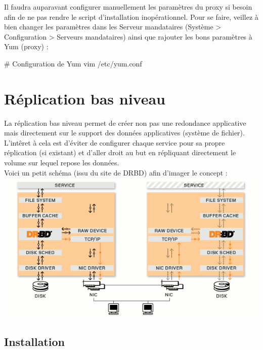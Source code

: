 \documentclass[11pt,a4paper]{report}
\begin{document}
                Il faudra auparavant configurer manuellement les paramètres du proxy si besoin afin de ne pas rendre le script d'installation inopérationnel.
                Pour se faire, veillez à bien changer les paramètres dans les Serveur mandataires (Système > Configuration > Serveurs mandataires) ainsi que rajouter les bons paramètres à Yum (proxy) :\\
                
                \begin{bashcode}
                    # Configuration de Yum
                    vim /etc/yum.conf
                \end{bashcode}
        
        \section{Réplication bas niveau}
            
            La réplication bas niveau permet de créer non pas une redondance applicative mais directement sur le support des données applicatives (système de fichier). L'intêret à cela est d'éviter de configurer chaque service pour sa propre réplication (si existant) et d'aller droit au but en répliquant directement le volume sur lequel repose les données.\\
            
            Voici un petit schéma (issu du site de DRBD) afin d'imager le concept : \\
            
            \includegraphics[keepaspectratio=true, width=\textwidth]{content/drbd.png}\\[1cm]
        
            \subsection{Installation}
                
\end{document}
